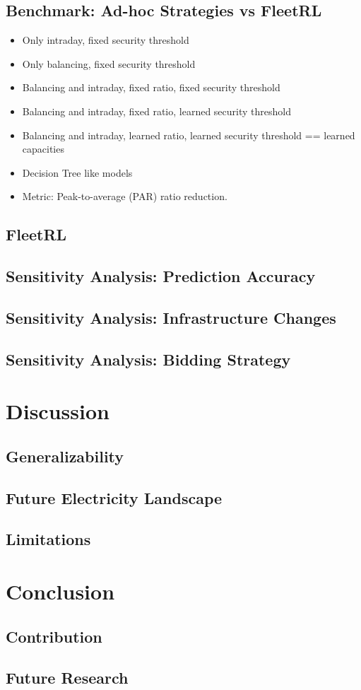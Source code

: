 \documentclass[a4paper, 12pt]{article}
\begin{document}
\subsection{Benchmark: Ad-hoc Strategies vs FleetRL}
\label{sec:orgb987dee}
\begin{itemize}
\item Only intraday, fixed security threshold
\item Only balancing, fixed security threshold
\item Balancing and intraday, fixed ratio, fixed security threshold
\item Balancing and intraday, fixed ratio, learned security threshold
\item Balancing and intraday, learned ratio, learned security threshold == learned capacities
\item Decision Tree like models
\item Metric: Peak-to-average (PAR) ratio reduction.
\end{itemize}
\subsection{FleetRL}
\label{sec:org004d88a}
\subsection{Sensitivity Analysis: Prediction Accuracy}
\label{sec:orgb08e677}
\subsection{Sensitivity Analysis: Infrastructure Changes}
\label{sec:org25215ae}
\subsection{Sensitivity Analysis: Bidding Strategy}
\label{sec:orgb436ddc}
\section{Discussion}
\label{sec:orgd3f0049}
\subsection{Generalizability}
\label{sec:org40f3d84}
\subsection{Future Electricity Landscape}
\label{sec:org8c10624}
\subsection{Limitations}
\label{sec:org67d3263}
\section{Conclusion}
\label{sec:org36a753e}
\subsection{Contribution}
\label{sec:org5d65044}
\subsection{Future Research}
\label{sec:orgc5c53d7}


\clearpage


\end{document}
